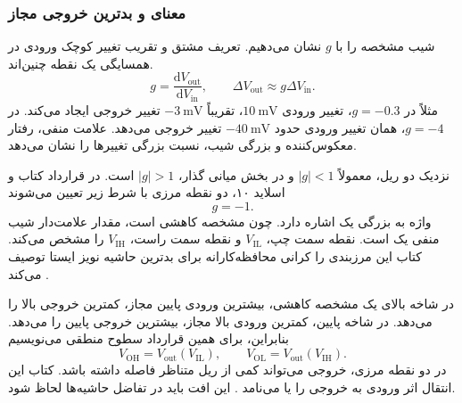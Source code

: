 \subsubsection{معنای  و بدترین خروجی مجاز}
\label{sec:noise-unity-gain}
شیب مشخصه را با \(g\) نشان می‌دهیم. تعریف مشتق و تقریب تغییر کوچک
ورودی در همسایگی یک نقطه چنین‌اند.
\[
 g=\frac{\mathrm{d}V_{\mathrm{out}}}{\mathrm{d}V_{\mathrm{in}}},\qquad
 \Delta V_{\mathrm{out}}\approx g\Delta V_{\mathrm{in}}.
\]
مثلاً در \(g=-0.3\)، تغییر ورودی
\(\qty{10}{\milli\volt}\)، تقریباً
\(-\qty{3}{\milli\volt}\) تغییر خروجی ایجاد می‌کند.
در \(g=-4\)، همان تغییر ورودی حدود
\(-\qty{40}{\milli\volt}\) تغییر خروجی می‌دهد.
علامت منفی، رفتار معکوس‌کننده و بزرگی شیب، نسبت بزرگی تغییرها
را نشان می‌دهد.

نزدیک دو ریل، معمولاً \(|g|<1\) و در بخش میانی گذار،
\(|g|>1\) است. در قرارداد کتاب و اسلاید ۱۰، دو نقطه مرزی
با شرط زیر تعیین می‌شوند
\begin{equation}
 \boxed{g=-1}.
 \label{eq:noise-unity-condition}
\end{equation}
واژه  به بزرگی یک اشاره دارد. چون مشخصه
 کاهشی است، مقدار علامت‌دار شیب منفی یک است.
نقطه سمت چپ، \(V_{\mathrm{IL}}\) و نقطه سمت راست،
\(V_{\mathrm{IH}}\) را مشخص می‌کند.
کتاب این مرزبندی را کرانی محافظه‌کارانه برای بدترین حاشیه نویز
ایستا توصیف می‌کند \cite[شکل  و صفحه ۹۲]{weste}.

در شاخه بالای یک مشخصه کاهشی، بیشترین ورودی پایین مجاز،
کمترین خروجی بالا را می‌دهد. در شاخه پایین، کمترین ورودی بالا
مجاز، بیشترین خروجی پایین را می‌دهد. بنابراین، برای همین
قرارداد سطوح منطقی می‌نویسیم
\begin{equation}
 V_{\mathrm{OH}}=V_{\mathrm{out}}(V_{\mathrm{IL}}),\qquad
 V_{\mathrm{OL}}=V_{\mathrm{out}}(V_{\mathrm{IH}}).
 \label{eq:noise-output-levels}
\end{equation}
در دو نقطه مرزی، خروجی می‌تواند کمی از ریل متناظر فاصله داشته
باشد. کتاب این انتقال اثر ورودی به خروجی را
 یا  می‌نامد
\cite[صفحه ۹۲]{weste}. این افت باید در تفاضل حاشیه‌ها لحاظ شود.

